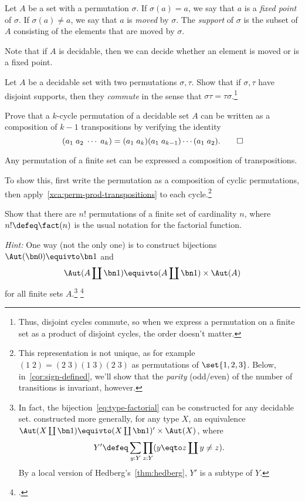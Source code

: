 \begin{definition}\label{def:support-permutation}
  Let $A$ be a set with a permutation $\sigma$.
  If $\sigma(a)=a$, we say that $a$ is a \emph{fixed point} of $\sigma$.
  If $\sigma(a)\ne a$, we say that $a$ is \emph{moved} by $\sigma$.
  The \emph{support} of $\sigma$ is the subset of $A$
  consisting of the elements that are moved by $\sigma$.
\end{definition}
Note that if $A$ is decidable, then we can decide whether an element is moved or is a fixed point.

\begin{xca}
  Let $A$ be a decidable set with two permutations $\sigma,\tau$.
  Show that if $\sigma,\tau$ have disjoint supports,
  then they \emph{commute} in the sense that $\sigma\tau=\tau\sigma$.\footnote{%
    Thus, disjoint cycles commute, so when we express a permutation
    on a finite set as a product of disjoint cycles, the order doesn't matter.}
\end{xca}
\begin{xca}\label{xca:perm-prod-transpositions}
  Prove that a $k$-cycle permutation of a decidable set $A$ can be written
  as a composition of $k-1$ transpositions by verifying the identity
  \[
    (a_1\; a_2\; \cdots\; a_k) = (a_1\; a_k)(a_1\;a_{k-1})\cdots(a_1\;a_2).
    \qedhere
  \]
\end{xca}
\begin{corollary}
  Any permutation of a finite set can be expressed a composition of transpositions.
\end{corollary}
To show this, first write the permutation as a composition of cyclic permutations,
then apply~\cref{xca:perm-prod-transpositions} to each cycle.\footnote{%
  This representation is not unique, as for example $(1\;2)=(2\;3)(1\;3)(2\;3)$
  as permutations of $\set{1,2,3}$.
  Below, in~\cref{cor:sign-defined}, we'll show that the \emph{parity} (odd/even)
  of the number of transitions is invariant, however.}

\begin{xca}
  Show that there are $n!$ permutations of a finite set of cardinality $n$, where $n! \defeq \fact(n)$ is the usual notation for the factorial function.

  \emph{Hint:} One way (not the only one) is to construct bijections
  $\Aut(\bn 0) \equivto \bn 1$ and
  \begin{equation}\label{eq:type-factorial}
    \Aut(A \coprod \bn 1) \equivto (A \coprod \bn 1) \times \Aut(A)
  \end{equation}
  for all finite sets $A$.\footnote{%
    In fact, the bijection~\eqref{eq:type-factorial}
    can be constructed for any decidable set.
    \citeauthor{EscardoFactorial}\footnotemark{} constructed more generally,
    for any type $X$, an equivalence
    $\Aut(X \coprod \bn 1) \equivto (X \coprod \bn 1)' \times \Aut(X)$,
    where
    \[
      Y' \defeq \sum_{y : Y}\prod_{z : Y}(y \eqto z \coprod y \ne z).
    \]
    By a local version of Hedberg's~\cref{thm:hedberg},
    $Y'$ is a subtype of $Y$.}%
  \footcitetext{EscardoFactorial}
\end{xca}

